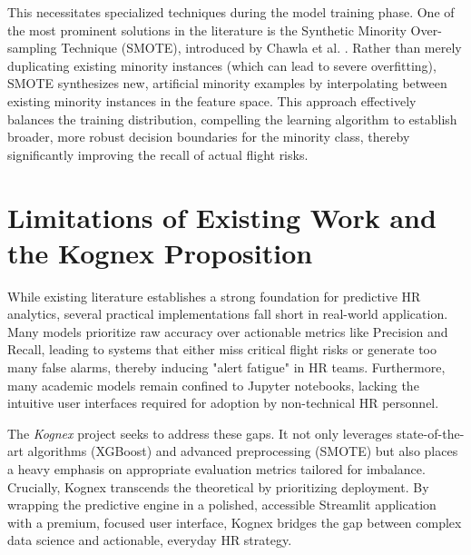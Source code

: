 This necessitates specialized techniques during the model training phase. One of the most prominent solutions in the literature is the Synthetic Minority Over-sampling Technique (SMOTE), introduced by Chawla et al. \cite{chawla2002smote}. Rather than merely duplicating existing minority instances (which can lead to severe overfitting), SMOTE synthesizes new, artificial minority examples by interpolating between existing minority instances in the feature space. This approach effectively balances the training distribution, compelling the learning algorithm to establish broader, more robust decision boundaries for the minority class, thereby significantly improving the recall of actual flight risks.

\section{Limitations of Existing Work and the Kognex Proposition}
While existing literature establishes a strong foundation for predictive HR analytics, several practical implementations fall short in real-world application. Many models prioritize raw accuracy over actionable metrics like Precision and Recall, leading to systems that either miss critical flight risks or generate too many false alarms, thereby inducing "alert fatigue" in HR teams. Furthermore, many academic models remain confined to Jupyter notebooks, lacking the intuitive user interfaces required for adoption by non-technical HR personnel.

The \textit{Kognex} project seeks to address these gaps. It not only leverages state-of-the-art algorithms (XGBoost) and advanced preprocessing (SMOTE) but also places a heavy emphasis on appropriate evaluation metrics tailored for imbalance. Crucially, Kognex transcends the theoretical by prioritizing deployment. By wrapping the predictive engine in a polished, accessible Streamlit application with a premium, focused user interface, Kognex bridges the gap between complex data science and actionable, everyday HR strategy.
